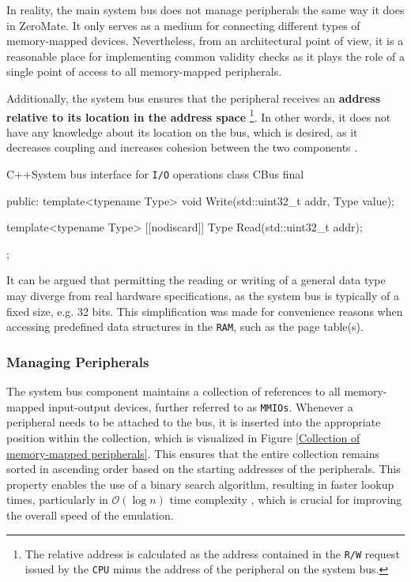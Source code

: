 \documentclass[english, ing, kiv, he, iso690numb, pdf]{fasthesis}
\begin{document}
	\begin{important}
		In reality, the main system bus does not manage peripherals the same way it does in ZeroMate. It only serves as a medium for connecting different types of memory-mapped devices. Nevertheless, from an architectural point of view, it is a reasonable place for implementing common validity checks as it plays the role of a single point of access to all memory-mapped peripherals.
	\end{important}
	
	\newpage
	
	Additionally, the system bus ensures that the peripheral receives an \textbf{address relative to its location in the address space} \footnote{The relative address is calculated as the address contained in the \texttt{R/W} request issued by the \texttt{CPU} minus the address of the peripheral on the system bus.}. In other words, it does not have any knowledge about its location on the bus, which is desired, as it decreases coupling and increases cohesion between the two components \cite{Coplien}.  
	
\begin{code}{C++}{System bus interface for \texttt{I/O} operations \label{System bus interface for I/O operations}}
class CBus final {
	public:
		template<typename Type>
		void Write(std::uint32_t addr, Type value);
		
		template<typename Type>
		[[nodiscard]] Type Read(std::uint32_t addr);
};
\end{code}
	
	\begin{important}
		It can be argued that permitting the reading or writing of a general data type may diverge from real hardware specifications, as the system bus is typically of a fixed size, e.g. 32 bits. This simplification was made for convenience reasons when accessing predefined data structures in the \texttt{RAM}, such as the page table(s).
	\end{important}
	
	\subsubsection{Managing Peripherals} \label{Managing Peripherals}
	
	The system bus component maintains a collection of references to all memory-mapped input-output devices, further referred to as \texttt{MMIOs}. Whenever a peripheral needs to be attached to the bus, it is inserted into the appropriate position within the collection, which is visualized in Figure \ref{Collection of memory-mapped peripherals}. This ensures that the entire collection remains sorted in ascending order based on the starting addresses of the peripherals. This property enables the use of a binary search algorithm, resulting in faster lookup times, particularly in $\mathcal{O}(\log n)$ time complexity \cite{binary-search}, which is crucial for improving the overall speed of the emulation.
	
\end{document}
